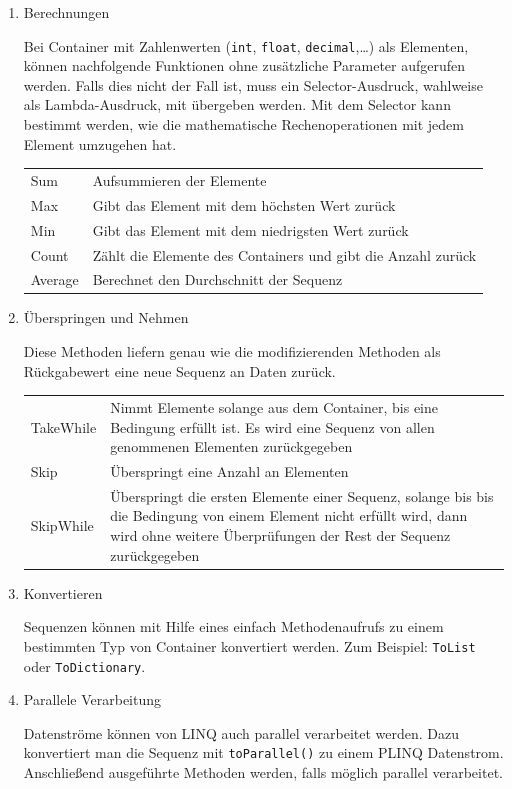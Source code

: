 \begin{enumerate}
\item Berechnungen

Bei Container mit Zahlenwerten (\texttt{int}, \texttt{float}, \texttt{decimal},\ldots{}) als Elementen,
können nachfolgende Funktionen ohne zusätzliche Parameter aufgerufen werden.
Falls dies nicht der Fall ist, muss ein Selector-Ausdruck, wahlweise als
Lambda-Ausdruck, mit übergeben werden. Mit dem Selector kann bestimmt werden, wie
die mathematische Rechenoperationen mit jedem Element umzugehen hat.

\bigskip
\begin{tabularx}{\textwidth}{p{130pt}|X}
Sum & Aufsummieren der Elemente\\
Max & Gibt das Element mit dem höchsten Wert zurück\\
Min & Gibt das Element mit dem niedrigsten Wert zurück\\
Count & Zählt die Elemente des Containers und gibt die Anzahl zurück\\
Average & Berechnet den Durchschnitt der Sequenz\\
\end{tabularx}

\item Überspringen und Nehmen

Diese Methoden liefern genau wie die modifizierenden Methoden als Rückgabewert
eine neue Sequenz an Daten zurück.

\bigskip
\begin{tabularx}{\textwidth}{p{130pt}|X}
TakeWhile & Nimmt Elemente solange aus dem Container, bis eine Bedingung erfüllt ist. Es wird eine Sequenz von allen genommenen Elementen zurückgegeben\\
Skip & Überspringt eine Anzahl an Elementen\\
SkipWhile & Überspringt die ersten Elemente einer Sequenz, solange bis bis die Bedingung von einem Element nicht erfüllt wird, dann wird ohne weitere Überprüfungen der Rest der Sequenz zurückgegeben\\
\end{tabularx}

\item Konvertieren

Sequenzen können mit Hilfe eines einfach Methodenaufrufs zu einem bestimmten Typ
von Container konvertiert werden. Zum Beispiel: \texttt{ToList} oder \texttt{ToDictionary}.

\item Parallele Verarbeitung

Datenströme können von LINQ auch parallel verarbeitet werden. Dazu konvertiert
man die Sequenz mit \texttt{toParallel()} zu einem PLINQ Datenstrom.
Anschließend ausgeführte Methoden werden, falls möglich parallel verarbeitet.

\end{enumerate}

